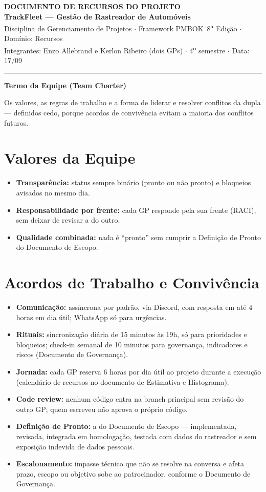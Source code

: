 \documentclass[11pt,a4paper]{article}
\newcommand{\cabecalho}[3]{%
  \begin{center}
  {\Large\bfseries DOCUMENTO DE #1 DO PROJETO}\\[2pt]
  {\large\bfseries TrackFleet --- Gestão de Rastreador de Automóveis}\\[4pt]
  Disciplina de Gerenciamento de Projetos $\cdot$ Framework PMBOK\textregistered\ 8\textsuperscript{a} Edição $\cdot$ Domínio: #2\\[2pt]
  Integrantes: Enzo Allebrand e Kerlon Ribeiro (dois GPs) $\cdot$ 4\textsuperscript{o} semestre $\cdot$ Data: #3
  \end{center}
  \vspace{2mm}\hrule\vspace{4mm}}
\newcommand{\parte}[1]{\noindent\textbf{\large #1}\par\vspace{1mm}}
\begin{document}
\cabecalho{RECURSOS}{Recursos}{17/09}

\parte{Termo da Equipe (Team Charter)}
\noindent Os valores, as regras de trabalho e a forma de liderar e resolver conflitos da dupla --- definidos cedo, porque acordos de convivência evitam a maioria dos conflitos futuros.

\section{Valores da Equipe}
\begin{itemize}[itemsep=2pt]
  \item \textbf{Transparência:} status sempre binário (pronto ou não pronto) e bloqueios avisados no mesmo dia.
  \item \textbf{Responsabilidade por frente:} cada GP responde pela sua frente (RACI), sem deixar de revisar a do outro.
  \item \textbf{Qualidade combinada:} nada é ``pronto'' sem cumprir a Definição de Pronto do Documento de Escopo.
\end{itemize}

\section{Acordos de Trabalho e Convivência}
\begin{itemize}[itemsep=4pt]
  \item \textbf{Comunicação:} assíncrona por padrão, via Discord, com resposta em até 4 horas em dia útil; WhatsApp só para urgências.
  \item \textbf{Rituais:} sincronização diária de 15 minutos às 19h, só para prioridades e bloqueios; check-in semanal de 10 minutos para governança, indicadores e riscos (Documento de Governança).
  \item \textbf{Jornada:} cada GP reserva 6 horas por dia útil ao projeto durante a execução (calendário de recursos no documento de Estimativa e Histograma).
  \item \textbf{Code review:} nenhum código entra na branch principal sem revisão do outro GP; quem escreveu não aprova o próprio código.
  \item \textbf{Definição de Pronto:} a do Documento de Escopo --- implementada, revisada, integrada em homologação, testada com dados do rastreador e sem exposição indevida de dados pessoais.
  \item \textbf{Escalonamento:} impasse técnico que não se resolve na conversa e afeta prazo, escopo ou objetivo sobe ao patrocinador, conforme o Documento de Governança.
\end{itemize}
\end{document}
